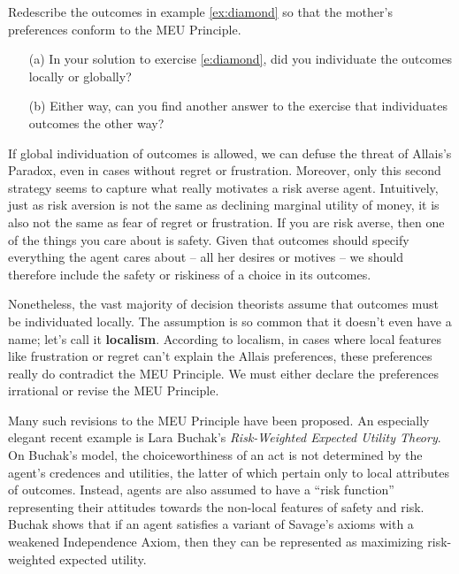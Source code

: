 \begin{exercise1}\label{e:diamond}
  Redescribe the outcomes in example \ref{ex:diamond} so that the
  mother's preferences conform to the MEU Principle.
\end{exercise1}

\begin{exercise2}
  \leavevmode\vspace{-2em}
  \begin{enumerate}
  \itemsep0em 
  \item[(a)] In your solution to exercise \ref{e:diamond}, did you
    individuate the outcomes locally or globally?
  \item[(b)] Either way, can you find another answer to the exercise that
    individuates outcomes the other way?
  \end{enumerate}
  \vspace{-2em}
\end{exercise2}

If global individuation of outcomes is allowed, we can defuse the
threat of Allais's Paradox, even in cases without regret or
frustration. Moreover, only this second strategy seems to capture what
really motivates a risk averse agent. Intuitively, just as risk
aversion is not the same as declining marginal utility of money, it is
also not the same as fear of regret or frustration. If you are risk
averse, then one of the things you care about is safety. Given that
outcomes should specify everything the agent cares about -- all her
desires or motives -- we should therefore include the safety or
riskiness of a choice in its outcomes.

Nonetheless, the vast majority of decision theorists assume that
outcomes must be individuated locally. The assumption is so common
that it doesn't even have a name; let's call it
\textbf{localism}. According to localism, in cases where local
features like frustration or regret can't explain the Allais
preferences, these preferences really do contradict the MEU
Principle. We must either declare the preferences irrational or revise
the MEU Principle.

Many such revisions to the MEU Principle have been proposed. An
especially elegant recent example is Lara Buchak's \emph{Risk-Weighted
  Expected Utility Theory}. On Buchak's model, the choiceworthiness of an
act is not determined by the agent's credences and utilities, the
latter of which pertain only to local attributes of outcomes. Instead,
agents are also assumed to have a ``risk function'' representing their
attitudes towards the non-local features of safety and risk. Buchak
shows that if an agent satisfies a variant of Savage's axioms with a
weakened Independence Axiom, then they can be represented as
maximizing risk-weighted expected utility.

